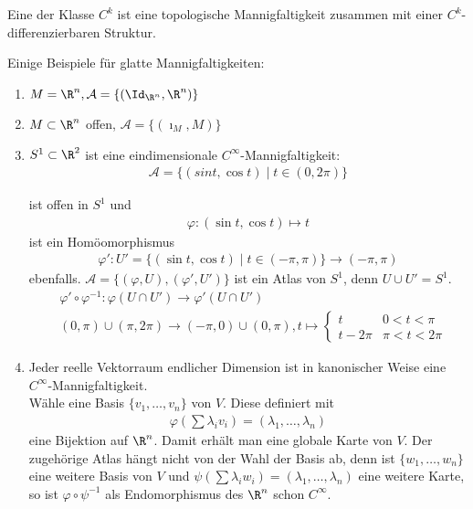 \begin{dfn}
  Eine  der Klasse $C^k$ ist eine topologische Mannigfaltigkeit zusammen mit einer $C^{k}$-differenzierbaren Struktur.\\
\end{dfn}

\begin{bsp}
  Einige Beispiele für glatte Mannigfaltigkeiten:
  \begin{enumerate}
  \item $M = \R^n, \mathcal A = \{(\Id_{\R^n},\R^n)\}$
  \item $M \subset \R^n$ offen, $\mathcal A = \{(\imath_{M},M)\}$
  \item $S^1 \subset \R^2$ ist eine eindimensionale $C^{\infty}$-Mannigfaltigkeit:
    \begin{align*}
      \mathcal A = \{(sin t, \cos t) \mid t \in (0,2\pi)\}
    \end{align*}


    ist offen in $S^1$ und
    \begin{align*}
      \varphi \colon (\sin t, \cos t) \mapsto t
    \end{align*}
    ist ein Homöomorphismus
    \begin{align*}
      \varphi' \colon U' = \{(\sin t, \cos t) \mid t \in (-\pi,\pi)\} \to (-\pi,\pi)
    \end{align*}
    ebenfalls. $\mathcal A = \{(\varphi, U), (\varphi',U')\}$ ist ein Atlas von $S^1$, denn $U \cup U' = S^1$.
    \begin{align*}
      & \varphi' \circ \varphi^{-1} \colon \varphi(U \cap U') \to \varphi'(U \cap U')\\
      & (0,\pi)\cup(\pi,2\pi) \to (-\pi,0)\cup(0,\pi), t \mapsto \begin{cases}
        t & 0 < t < \pi\\
        t-2\pi & \pi < t < 2\pi
      \end{cases}
    \end{align*}

  \item Jeder reelle Vektorraum endlicher Dimension ist in kanonischer Weise eine $C^{\infty}$-Mannigfaltigkeit.\\
    Wähle eine Basis $\{v_1, \ldots, v_n\}$ von $V$. Diese definiert mit
    \begin{align*}
      \varphi\left(\sum\lambda_iv_i\right) = (\lambda_1, \ldots, \lambda_n)
    \end{align*}
    eine Bijektion auf $\R^n$. Damit erhält man eine globale Karte von $V$.
    Der zugehörige Atlas hängt nicht von der Wahl der Basis ab, denn ist $\{w_1, \ldots, w_n\}$ eine weitere Basis von $V$ und $\psi(\sum \lambda_iw_i) = (\lambda_1, \ldots, \lambda_n)$ eine weitere Karte, so ist $\varphi \circ \psi^{-1}$ als Endomorphismus des $\R^n$ schon $C^{\infty}$.


\end{enumerate}
\end{bsp}
